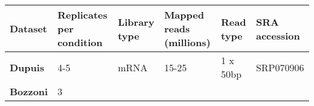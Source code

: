 \begin{longtable}[]{@{}llllll@{}}
	\toprule
	\begin{minipage}[t]{0.14\columnwidth}\raggedright\strut
		{\textbf{Dataset}}\strut
	\end{minipage} & \begin{minipage}[t]{0.14\columnwidth}\raggedright\strut
		{\textbf{Replicates per condition}}\strut
	\end{minipage} & \begin{minipage}[t]{0.14\columnwidth}\raggedright\strut
		{\textbf{Library type}}\strut
	\end{minipage} & \begin{minipage}[t]{0.14\columnwidth}\raggedright\strut
		{\textbf{Mapped reads (millions)}}\strut
	\end{minipage} & \begin{minipage}[t]{0.14\columnwidth}\raggedright\strut
		{\textbf{Read type}}\strut
	\end{minipage} & \begin{minipage}[t]{0.14\columnwidth}\raggedright\strut
		{\textbf{SRA accession}}\strut
	\end{minipage}\tabularnewline\hline
	\begin{minipage}[t]{0.14\columnwidth}\raggedright\strut
		{\textbf{Dupuis}}\strut
	\end{minipage} & \begin{minipage}[t]{0.14\columnwidth}\raggedright\strut
		{4-5}\strut
	\end{minipage} & \begin{minipage}[t]{0.14\columnwidth}\raggedright\strut
		{mRNA}\strut
	\end{minipage} & \begin{minipage}[t]{0.14\columnwidth}\raggedright\strut
		{15-25}\strut
	\end{minipage} & \begin{minipage}[t]{0.14\columnwidth}\raggedright\strut
		{1 x 50bp}\strut
	\end{minipage} & \begin{minipage}[t]{0.14\columnwidth}\raggedright\strut
		{SRP070906 }\strut
	\end{minipage}\tabularnewline
	\begin{minipage}[t]{0.14\columnwidth}\raggedright\strut
		{\textbf{Bozzoni} }\strut
	\end{minipage} & \begin{minipage}[t]{0.14\columnwidth}\raggedright\strut
		{3}\strut
	\end{minipage} & \begin{minipage}[t]{0.14\columnwidth}\raggedright\strut

\end{minipage}
\end{longtable}

